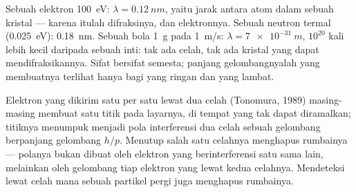 \begin{example}\label{ex:b1:quantum-introduction:wavelengths}
Sebuah elektron \qty{100}{eV}: $\lambda = \qty{0.12}{nm}$, yaitu jarak antara
atom dalam sebuah kristal --- karena itulah difraksinya, dan 
elektronnya. Sebuah neutron termal (\qty{0.025}{eV}): \qty{0.18}{nm}. Sebuah bola
\qty{1}{g} pada \qty{1}{m/s}: $\lambda = \qty{7e-31}{m}$, $10^{20}$ kali
lebih kecil daripada sebuah inti: tak ada celah, tak ada kristal yang dapat mendifraksikannya.
Sifat  bersifat semesta; panjang gelombangnyalah yang membuatnya
terlihat hanya bagi yang ringan dan yang lambat.
\end{example}

\begin{proposition}\label{prop:b1:quantum-introduction:buildup}
Elektron yang dikirim satu per satu lewat dua celah (Tonomura, 1989) masing-masing
membuat satu titik pada layarnya, di tempat yang tak dapat diramalkan;
titiknya menumpuk menjadi pola interferensi dua celah sebuah gelombang
berpanjang gelombang $h/p$. Menutup salah satu celahnya menghapus rumbainya --- polanya
bukan dibuat oleh elektron yang berinterferensi satu sama lain, melainkan oleh
gelombang tiap elektron yang lewat kedua celahnya. Mendeteksi lewat celah mana
sebuah partikel pergi juga menghapus rumbainya.
\end{proposition}
\admitted

